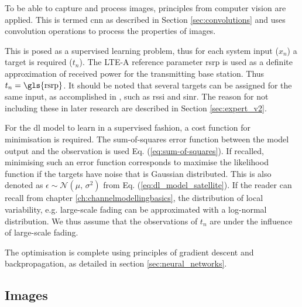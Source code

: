 To be able to capture and process images, principles from computer vision are applied. This is termed \gls{cnn} as described in Section \ref{sec:convolutions} and uses convolution operations to process the properties of images.

This is posed as a supervised learning problem, thus for each system input ($x_n$) a target is required ($t_n$). The LTE-A reference parameter \acrfull{rsrp} is used as a definite approximation of received power for the transmitting base station. Thus $t_n = \text{\gls{rsrp}}$. It should be noted that several targets can be assigned for the same input, as accomplished in \cite{Thrane2018DriveApproximation}, such as \gls{rssi} and \gls{sinr}. The reason for not including these in later research are described in Section \ref{sec:expert_v2}.

For the \gls{dl} model to learn in a supervised fashion, a cost function for minimisation is required. The sum-of-squares error function between the model output and the observation is used Eq. (\ref{eq:sum-of-squares}). If recalled, minimising such an error function corresponds to maximise the likelihood function if the targets have noise that is Gaussian distributed. This is also denoted as $\epsilon \sim \mathcal{N}(\mu,\,\sigma^{2})$ from Eq. (\ref{eq:dl_model_satellite}). If the reader can recall from chapter \ref{ch:channelmodellingbasics}, the distribution of local variability, e.g. large-scale fading can be approximated with a log-normal distribution. We thus assume that the observations of $t_n$ are under the influence of large-scale fading.

The optimisation is complete using principles of gradient descent and backpropagation, as detailed in section \ref{sec:neural_networks}.



\subsection{Images}


